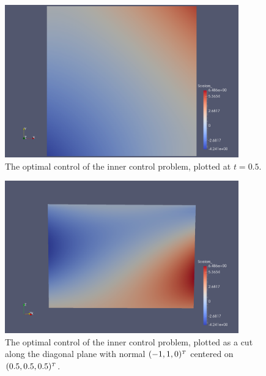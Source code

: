 \documentclass[../thesis.tex]{subfiles}
\begin{document}
\begin{figure}[htpb]
\centering
\includegraphics[width=0.9\textwidth]{Images/inner-u-cut-midtime.png}
\caption{The optimal control of the inner control problem, plotted at $t = 0.5$.}
\label{fig:inner-u-midtime}
\end{figure}
\begin{figure}[htpb]
\centering
\includegraphics[width=0.9\textwidth]{Images/inner-u-cut-diag.png}
\caption{The optimal control of the inner control problem, plotted as a cut along the diagonal plane with normal $(-1, 1, 0)^\tp$ centered on $(0.5, 0.5, 0.5)^\tp$.}
\label{fig:inner-u-diag}
\end{figure}
\FloatBarrier
\end{document}
